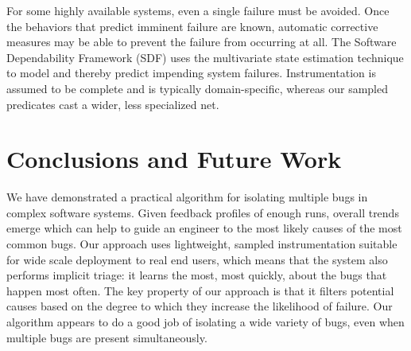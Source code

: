 \documentclass{sig-alternate}
\newcommand{\comment}[1]{}
\begin{document}
\comment{More recent work of interest:

  \begin{itemize}
  \item S.\ Elbaum, S.\ Kanduri and A.\ Andrews, ``Anomalies as
    Precursors of Field Failures, International Symposium of Software
    Reliability Engineering'', IEEE, November 2003.

  \item S.\ Elbaum and M.\ Hardojo, ``An Empirical Study on Profiling
    Strategies for Released Software and Their Application to QA
    Activities'', Technical Report TR03-09-01, University of Nebraska
    - Lincoln, September 2003.
  \end{itemize}

  Cannot find either online, but have written to Elbaum asking him for
  copies.}

For some highly available systems, even a single failure must be
avoided.  Once the behaviors that predict imminent failure are known,
automatic corrective measures may be able to prevent the failure from
occurring at all.  The Software Dependability Framework (SDF)
\cite{Gross:2003:PSMUST} uses the multivariate state estimation
technique to model and thereby predict impending system failures.
Instrumentation is assumed to be complete and is typically
domain-specific, whereas our sampled predicates cast a wider, less
specialized net.  \comment{We understand through informal
  communication that the SDF is able to anticipate when a player is
  about to lose an instrumented game of Tetris, and can intervene by
  removing rows to allow the game to continue.  But maybe I shouldn't
  say that, as it kind of makes their system sound like a joke.}

\comment{Cannot find any more recent work by these people in this
  area.  Where did they all go?  Porter has plenty of other recent
  work, but apparently nothing related.  Gross and McMaster have zero
  publication information on their home pages, while Umranov and Votta
  seem to have vanished entirely.  Have written to Gross and Porter
  asking if they have anything more recent I should look at.}

\section{Conclusions and Future Work}
\label{sec:conclusions}

We have demonstrated a practical algorithm for isolating multiple bugs
in complex software systems.  Given feedback profiles of enough runs,
overall trends emerge which can help to guide an engineer to the most
likely causes of the most common bugs.  Our approach uses lightweight,
sampled instrumentation suitable for wide scale deployment to real end
users, which means that the system also performs implicit triage: it
learns the most, most quickly, about the bugs that happen most often.
The key property of our approach is that it filters potential causes
based on the degree to which they increase the likelihood of failure.
Our algorithm appears to do a good job of isolating a wide variety of
bugs, even when multiple bugs are present simultaneously.
\end{document}
